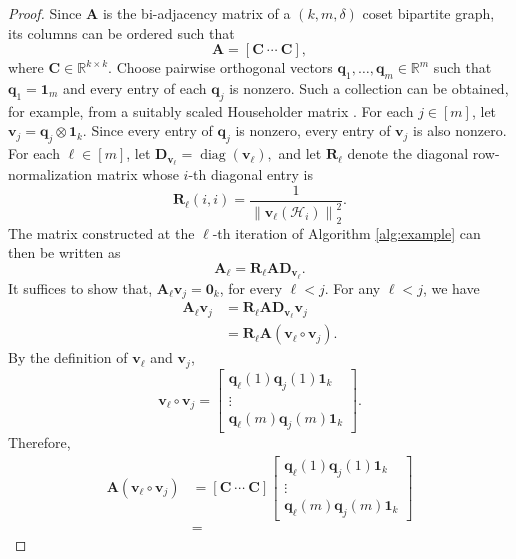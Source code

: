 \documentclass[journal,draftcls,onecolumn]{IEEEtran}
\theoremstyle{mystyle}
\begin{document}
\begin{proof}
Since $\mathbf{A}$ is the bi-adjacency matrix of a $(k,m,\delta)$ coset bipartite graph, its columns can be ordered such that
\[
\mathbf{A}
=
\left[
\mathbf{C}\ \cdots\ \mathbf{C}
\right],
\]
where $\mathbf{C}\in\mathbb{R}^{k\times k}$. Choose pairwise orthogonal vectors
$\mathbf{q}_1,\ldots,\mathbf{q}_m\in\mathbb{R}^m$ such that
$\mathbf{q}_1=\mathbf{1}_m$ and every entry of each $\mathbf{q}_j$ is nonzero. Such a collection can be obtained, for example, from a suitably scaled Householder matrix \cite{10.1145/320941.320947}. For each $j\in[m]$, let $
\mathbf{v}_j
=
\mathbf{q}_j\otimes\mathbf{1}_k.$ Since every entry of $\mathbf{q}_j$ is nonzero, every entry of $\mathbf{v}_j$ is also nonzero. For each $\ell\in[m]$, let
$
\mathbf{D}_{\mathbf{v}_\ell}
=
\operatorname{diag}(\mathbf{v}_\ell),
$
and let $\mathbf{R}_\ell$ denote the diagonal row-normalization matrix whose $i$-th diagonal entry is
\[
\mathbf{R}_\ell(i,i)
=
\frac{1}
{\left\|\mathbf{v}_\ell(\mathcal{H}_i)\right\|_2^2}.
\]
The matrix constructed at the $\ell$-th iteration of Algorithm \ref{alg:example} can then be written as
\[
\mathbf{A}_\ell
=
\mathbf{R}_\ell
\mathbf{A}
\mathbf{D}_{\mathbf{v}_\ell}.
\]
It suffices to show that,
$
\mathbf{A}_\ell\mathbf{v}_j=\mathbf{0}_k$, for every $\ell < j$.
For any $\ell<j$, we have
\[
\begin{aligned}
\mathbf{A}_\ell\mathbf{v}_j
&=
\mathbf{R}_\ell
\mathbf{A}
\mathbf{D}_{\mathbf{v}_\ell}
\mathbf{v}_j\\
&=
\mathbf{R}_\ell
\mathbf{A}
\left(
\mathbf{v}_\ell\circ\mathbf{v}_j
\right).
\end{aligned}
\]
By the definition of $\mathbf{v}_\ell$ and $\mathbf{v}_j$,
\[
\mathbf{v}_\ell\circ\mathbf{v}_j
=
\begin{bmatrix}
\mathbf{q}_\ell(1)\mathbf{q}_j(1)\mathbf{1}_k\\
\vdots\\
\mathbf{q}_\ell(m)\mathbf{q}_j(m)\mathbf{1}_k
\end{bmatrix}.
\]
Therefore, 
\[
\begin{aligned}
\mathbf{A}
\left(
\mathbf{v}_\ell\circ\mathbf{v}_j
\right)
&=
\left[
\mathbf{C}\ \cdots\ \mathbf{C}
\right]
\begin{bmatrix}
\mathbf{q}_\ell(1)\mathbf{q}_j(1)\mathbf{1}_k\\
\vdots\\
\mathbf{q}_\ell(m)\mathbf{q}_j(m)\mathbf{1}_k
\end{bmatrix}\\
&=

\end{aligned}\]
\end{proof}
\end{document}
